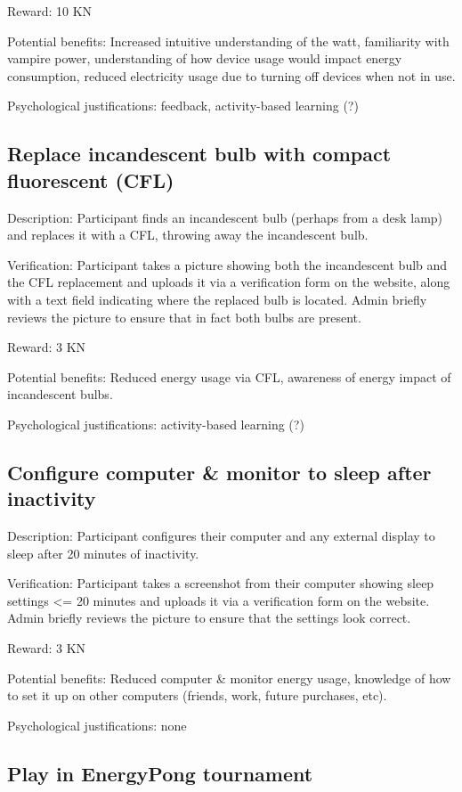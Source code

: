 Reward: 10 KN

Potential benefits: Increased intuitive understanding of the watt, familiarity with vampire power, understanding of how device usage would impact energy consumption, reduced electricity usage due to turning off devices when not in use.

Psychological justifications: feedback, activity-based learning (?)

\subsection{Replace incandescent bulb with compact fluorescent (CFL)}

Description: Participant finds an incandescent bulb (perhaps from a desk lamp) and replaces it with a CFL, throwing away the incandescent bulb.

Verification: Participant takes a picture showing both the incandescent bulb and the CFL replacement and uploads it via a verification form on the website, along with a text field indicating where the replaced bulb is located. Admin briefly reviews the picture to ensure that in fact both bulbs are present.

Reward: 3 KN

Potential benefits: Reduced energy usage via CFL, awareness of energy impact of incandescent bulbs.

Psychological justifications: activity-based learning (?)

\subsection{Configure computer \& monitor to sleep after inactivity}

Description: Participant configures their computer and any external display to sleep after 20 minutes of inactivity.

Verification: Participant takes a screenshot from their computer showing sleep settings <= 20 minutes and uploads it via a verification form on the website. Admin briefly reviews the picture to ensure that the settings look correct.

Reward: 3 KN

Potential benefits: Reduced computer \& monitor energy usage, knowledge of how to set it up on other computers (friends, work, future purchases, etc).

Psychological justifications: none

\subsection{Play in EnergyPong tournament}

